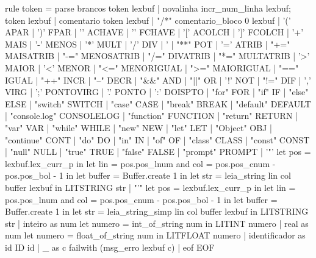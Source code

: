 \documentclass[12pt,a4paper,twoside]{article}
\begin{document}
\begin{terminal}
rule token = parse
  brancos       { token lexbuf }
| novalinha     { incr_num_linha lexbuf; token lexbuf }
| comentario    { token lexbuf }
| "/*"          { comentario_bloco 0 lexbuf }
| '('            { APAR }
| ')'           { FPAR }
| '{'           { ACHAVE }
| '}'           { FCHAVE }
| '['           { ACOLCH }
| ']'           { FCOLCH }
| '+'           { MAIS }
| '-'           { MENOS }
| '*'           { MULT }
| '/'           { DIV }
| '%
| "**"          { POT }
| '='           { ATRIB }
| "+="          { MAISATRIB }
| "-="          { MENOSATRIB }
| "/="          { DIVATRIB }
| "*="          { MULTATRIB }
| '>'           { MAIOR }
| '<'           { MENOR }
| "<="          { MENORIGUAL }
| ">="          { MAIORIGUAL }
| "=="          { IGUAL }
| "++"          { INCR }
| "--"          { DECR }
| "&&"          { AND }
| "||"          { OR }
| '!'           { NOT }
| "!="          { DIF }
| ','           { VIRG }
| ';'           { PONTOVIRG }
| '.'           { PONTO }
| ':'           { DOISPTO }
| "for"         { FOR }
| "if"          { IF }
| "else"        { ELSE }
| "switch"      { SWITCH }
| "case"        { CASE }
| "break"       { BREAK }
| "default"     { DEFAULT }
| "console.log"   { CONSOLELOG }
| "function"        { FUNCTION }
| "return"           { RETURN }
| "var"                { VAR }
| "while"             { WHILE }
| "new"              { NEW }
| "let"                 { LET }
| "Object"          { OBJ }
| "continue"       { CONT }
| "do"          { DO }
| "in"          { IN }
| "of"          { OF }
| "class"       { CLASS }
| "const"       { CONST }
| "null"        { NULL }
| "true"        { TRUE }
| "false"       { FALSE }
| "prompt"      { PROMPT }
| '"'           { let pos = lexbuf.lex_curr_p in
                    let lin = pos.pos_lnum
                    and col = pos.pos_cnum - pos.pos_bol - 1 in
                    let buffer = Buffer.create 1 in
                    let str = leia_string lin col buffer lexbuf in
                    LITSTRING str }
| "'"           {let pos = lexbuf.lex_curr_p in
                    let lin = pos.pos_lnum
                    and col = pos.pos_cnum - pos.pos_bol - 1 in
                    let buffer = Buffer.create 1 in
                    let str = leia_string_simp lin col buffer lexbuf in
                    LITSTRING str}
| inteiro as num  { let numero = int_of_string num in 
                    LITINT numero  } 
| real as num     { let numero = float_of_string num in 
                    LITFLOAT numero  } 
| identificador as id { ID id }
| _ as c  { failwith (msg_erro lexbuf c) }
| eof        { EOF }


\end{terminal}
\end{document}
